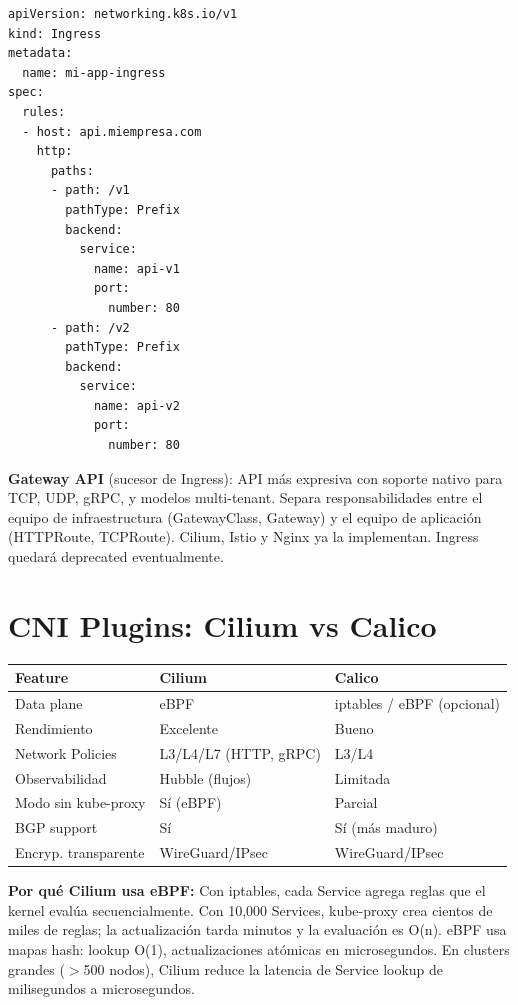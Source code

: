 \begin{codigo}
\begin{lstlisting}
apiVersion: networking.k8s.io/v1
kind: Ingress
metadata:
  name: mi-app-ingress
spec:
  rules:
  - host: api.miempresa.com
    http:
      paths:
      - path: /v1
        pathType: Prefix
        backend:
          service:
            name: api-v1
            port:
              number: 80
      - path: /v2
        pathType: Prefix
        backend:
          service:
            name: api-v2
            port:
              number: 80
\end{lstlisting}
\end{codigo}

\begin{moderno}
 \textbf{Gateway API} (sucesor de Ingress): API más expresiva con soporte
nativo para TCP, UDP, gRPC, y modelos multi-tenant. Separa responsabilidades entre el
equipo de infraestructura (GatewayClass, Gateway) y el equipo de aplicación (HTTPRoute,
TCPRoute). Cilium, Istio y Nginx ya la implementan. Ingress quedará deprecated eventualmente.
\end{moderno}

\section{ CNI Plugins: Cilium vs Calico}

\begin{center}
\begin{tabular}{lll}
\toprule
\textbf{Feature} & \textbf{Cilium} & \textbf{Calico} \\
\midrule
Data plane         & eBPF                & iptables / eBPF (opcional) \\
Rendimiento        & Excelente           & Bueno \\
Network Policies   & L3/L4/L7 (HTTP, gRPC) & L3/L4 \\
Observabilidad     & Hubble (flujos)     & Limitada \\
Modo sin kube-proxy & Sí (eBPF)          & Parcial \\
BGP support        & Sí                  & Sí (más maduro) \\
Encryp. transparente & WireGuard/IPsec   & WireGuard/IPsec \\
\bottomrule
\end{tabular}
\end{center}

\begin{ejemplo}
\textbf{Por qué Cilium usa eBPF:}
Con iptables, cada Service agrega reglas que el kernel evalúa secuencialmente.
Con 10,000 Services, kube-proxy crea cientos de miles de reglas; la actualización
tarda minutos y la evaluación es O(n). eBPF usa mapas hash: lookup O(1), actualizaciones
atómicas en microsegundos. En clusters grandes ($>$500 nodos), Cilium reduce la latencia
de Service lookup de milisegundos a microsegundos.
\end{ejemplo}

